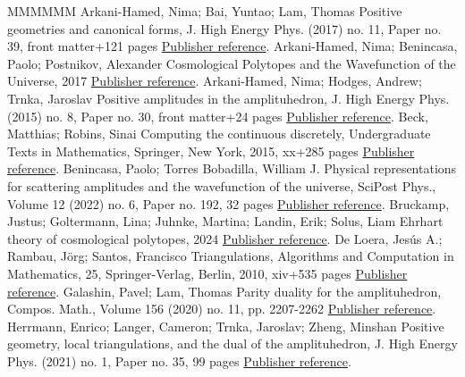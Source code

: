 \documentclass[11pt]{article}
\theoremstyle{definition}
\numberwithin{equation}{section}
\begin{document}
\begin{thebibliography}{MMMMMM}
 Arkani-Hamed, Nima; Bai, Yuntao; Lam, Thomas Positive geometries and canonical forms, J. High Energy Phys. (2017) no. 11, Paper no. 39, front matter+121 pages \href{https://alco.centre-mersenne.org/articles/10.5802/alco.430/#arkani2017positive}{Publisher reference}.
 Arkani-Hamed, Nima; Benincasa, Paolo; Postnikov, Alexander Cosmological Polytopes and the Wavefunction of the Universe, 2017 \href{https://alco.centre-mersenne.org/articles/10.5802/alco.430/#arkani2017cosmological}{Publisher reference}.
 Arkani-Hamed, Nima; Hodges, Andrew; Trnka, Jaroslav Positive amplitudes in the amplituhedron, J. High Energy Phys. (2015) no. 8, Paper no. 30, front matter+24 pages \href{https://alco.centre-mersenne.org/articles/10.5802/alco.430/#arkani2015positive}{Publisher reference}.
 Beck, Matthias; Robins, Sinai Computing the continuous discretely, Undergraduate Texts in Mathematics, Springer, New York, 2015, xx+285 pages \href{https://alco.centre-mersenne.org/articles/10.5802/alco.430/#ccd}{Publisher reference}.
 Benincasa, Paolo; Torres Bobadilla, William J. Physical representations for scattering amplitudes and the wavefunction of the universe, SciPost Phys., Volume 12 (2022) no. 6, Paper no. 192, 32 pages \href{https://alco.centre-mersenne.org/articles/10.5802/alco.430/#benincasa2022physical}{Publisher reference}.
 Bruckamp, Justus; Goltermann, Lina; Juhnke, Martina; Landin, Erik; Solus, Liam Ehrhart theory of cosmological polytopes, 2024 \href{https://alco.centre-mersenne.org/articles/10.5802/alco.430/#bruckamp2024ehrhart}{Publisher reference}.
 De Loera, Jesús A.; Rambau, Jörg; Santos, Francisco Triangulations, Algorithms and Computation in Mathematics, 25, Springer-Verlag, Berlin, 2010, xiv+535 pages \href{https://alco.centre-mersenne.org/articles/10.5802/alco.430/#DRS}{Publisher reference}.
 Galashin, Pavel; Lam, Thomas Parity duality for the amplituhedron, Compos. Math., Volume 156 (2020) no. 11, pp. 2207-2262 \href{https://alco.centre-mersenne.org/articles/10.5802/alco.430/#galashin2020parity}{Publisher reference}.
 Herrmann, Enrico; Langer, Cameron; Trnka, Jaroslav; Zheng, Minshan Positive geometry, local triangulations, and the dual of the amplituhedron, J. High Energy Phys. (2021) no. 1, Paper no. 35, 99 pages \href{https://alco.centre-mersenne.org/articles/10.5802/alco.430/#herrmann2021positive}{Publisher reference}.

\end{thebibliography}
\end{document}

